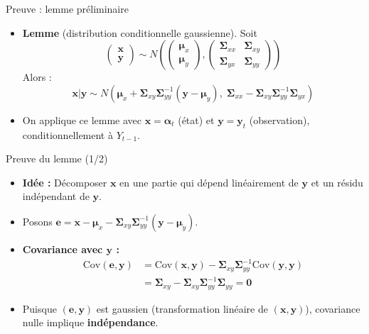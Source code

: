 \documentclass[11pt,aspectratio=169]{beamer}
\newcommand{\Cov}{\mathrm{Cov}}
\begin{document}
\begin{frame}{Preuve : lemme préliminaire}

\begin{itemize}

\item \textbf{Lemme} (distribution conditionnelle gaussienne). Soit
  \[
  \begin{pmatrix} \bm{x} \\ \bm{y} \end{pmatrix} \sim N\!\left( \begin{pmatrix} \bm{\mu}_x \\ \bm{\mu}_y \end{pmatrix}, \begin{pmatrix} \bm{\Sigma}_{xx} & \bm{\Sigma}_{xy} \\ \bm{\Sigma}_{yx} & \bm{\Sigma}_{yy} \end{pmatrix} \right)
  \]
  Alors :
  \[
  \bm{x} | \bm{y} \sim N\!\left( \bm{\mu}_x + \bm{\Sigma}_{xy} \bm{\Sigma}_{yy}^{-1} (\bm{y} - \bm{\mu}_y), \; \bm{\Sigma}_{xx} - \bm{\Sigma}_{xy} \bm{\Sigma}_{yy}^{-1} \bm{\Sigma}_{yx} \right)
  \]\newline

\item On applique ce lemme avec $\bm{x} = \bm{\alpha}_t$ (état) et $\bm{y} = \bm{y}_t$ (observation), conditionnellement à $Y_{t-1}$.

\end{itemize}

\end{frame}

\begin{frame}{Preuve du lemme (1/2)}

\begin{itemize}

\item \textbf{Idée :} Décomposer $\bm{x}$ en une partie qui dépend linéairement de $\bm{y}$ et un résidu indépendant de $\bm{y}$.\newline

\item Posons $\bm{e} = \bm{x} - \bm{\mu}_x - \bm{\Sigma}_{xy} \bm{\Sigma}_{yy}^{-1} (\bm{y} - \bm{\mu}_y)$.\newline

\item \textbf{Covariance avec $\bm{y}$ :}
  \begin{align*}
  \Cov(\bm{e}, \bm{y}) &= \Cov(\bm{x}, \bm{y}) - \bm{\Sigma}_{xy} \bm{\Sigma}_{yy}^{-1} \Cov(\bm{y}, \bm{y}) \\
  &= \bm{\Sigma}_{xy} - \bm{\Sigma}_{xy} \bm{\Sigma}_{yy}^{-1} \bm{\Sigma}_{yy} = \bm{0}
  \end{align*}\newline

\item Puisque $(\bm{e}, \bm{y})$ est gaussien (transformation linéaire de $(\bm{x}, \bm{y})$), covariance nulle implique \textbf{indépendance}.

\end{itemize}

\end{frame}
\end{document}
